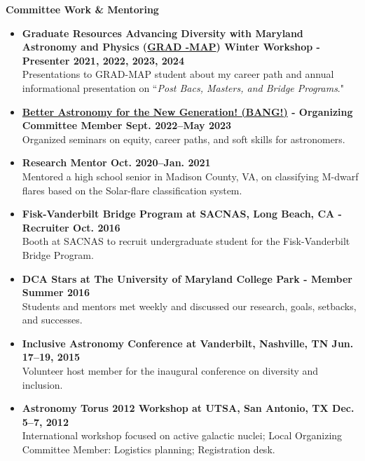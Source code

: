 \documentclass[12pt]{article}
\begin{document}
\noindent
\vspace{-3mm}
{\bf Committee Work \& Mentoring} \\
\vspace{-13mm}
\begin{center}
\end{center}
\vspace{-3mm}
\begin{itemize}
    \item \textbf{Graduate Resources Advancing Diversity with Maryland Astronomy and Physics (\href{https://www.umdgradmap.org/}{GRAD -MAP}) Winter Workshop - Presenter \hfill 2021, 2022, 2023, 2024} \\
    Presentations to GRAD-MAP student about my career path and annual informational presentation on ``{\it Post Bacs, Masters, and Bridge Programs}."
    \item \textbf{\href{https://www.astro.umd.edu/events/colloquia/bang.html}{Better Astronomy for the New Generation! (BANG!)} - Organizing Committee Member \hfill Sept. 2022--May 2023} \\
    Organized seminars on equity, career paths, and soft skills for astronomers.
    \item \textbf{Research Mentor \hfill Oct. 2020--Jan. 2021} \\
    Mentored a high school senior in Madison County, VA, on classifying M-dwarf flares based on the Solar-flare classification system.
    \item \textbf{Fisk-Vanderbilt Bridge Program at SACNAS, Long Beach, CA - Recruiter \hfill Oct. 2016} \\
    Booth at SACNAS to recruit undergraduate student for the Fisk-Vanderbilt Bridge Program.
    \item \textbf{DCA Stars at The University of Maryland College Park - Member \hfill Summer 2016} \\
    Students and mentors met weekly and discussed our research, goals, setbacks, and successes.
    \item \textbf{Inclusive Astronomy Conference at Vanderbilt, Nashville, TN \hfill Jun. 17--19, 2015} \\
    Volunteer host member for the inaugural conference on diversity and inclusion.
    \item \textbf{Astronomy Torus 2012 Workshop at UTSA, San Antonio, TX \hfill Dec. 5--7, 2012} \\
    International workshop focused on active galactic nuclei; Local Organizing Committee Member: Logistics planning; Registration desk.
\end{itemize}
\end{document}
